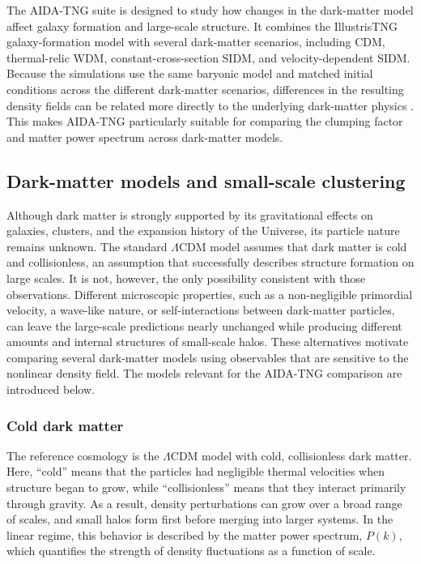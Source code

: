 The AIDA-TNG suite is designed to study how changes in the dark-matter model affect galaxy formation and large-scale structure. It combines the IllustrisTNG galaxy-formation model with several dark-matter scenarios, including CDM, thermal-relic WDM, constant-cross-section SIDM, and velocity-dependent SIDM. Because the simulations use the same baryonic model and matched initial conditions across the different dark-matter scenarios, differences in the resulting density fields can be related more directly to the underlying dark-matter physics \cite{despali2025aidatng}. This makes AIDA-TNG particularly suitable for comparing the clumping factor and matter power spectrum across dark-matter models.

\subsection{Dark-matter models and small-scale clustering}

Although dark matter is strongly supported by its gravitational effects on galaxies, clusters, and the expansion history of the Universe, its particle nature remains unknown. The standard $\Lambda$CDM model assumes that dark matter is cold and collisionless, an assumption that successfully describes structure formation on large scales. It is not, however, the only possibility consistent with those observations. Different microscopic properties, such as a non-negligible primordial velocity, a wave-like nature, or self-interactions between dark-matter particles, can leave the large-scale predictions nearly unchanged while producing different amounts and internal structures of small-scale halos. These alternatives motivate comparing several dark-matter models using observables that are sensitive to the nonlinear density field. The models relevant for the AIDA-TNG comparison are introduced below.

\subsubsection{Cold dark matter}

The reference cosmology is the $\Lambda$CDM model with cold, collisionless dark matter. Here, ``cold'' means that the particles had negligible thermal velocities when structure began to grow, while ``collisionless'' means that they interact primarily through gravity. As a result, density perturbations can grow over a broad range of scales, and small halos form first before merging into larger systems. In the linear regime, this behavior is described by the matter power spectrum, $P(k)$, which quantifies the strength of density fluctuations as a function of scale.

